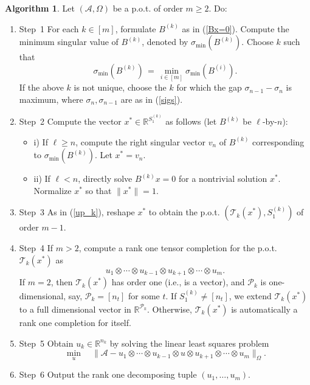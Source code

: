 \documentclass{amsart}
\newcommand{\re}{\mathbb{R}}
\newcommand{\sig}{\sigma}
\newcommand{\reff}[1]{(\ref{#1})}
\newcommand{\mc}[1]{\mathcal{#1}}
\newcommand{\ddd}{,\ldots,}
\newcommand{\bnum}{\begin{enumerate}}
\newcommand{\enum}{\end{enumerate}}
\newcommand{\bit}{\begin{itemize}}
\newcommand{\eit}{\end{itemize}}
\newcommand{\be}{\begin{equation}}
\newcommand{\ee}{\end{equation}}
\theoremstyle{definition}
\newtheorem{alg}[theorem]{Algorithm}
\numberwithin{equation}{section}
\begin{document}
\begin{alg}\label{alg:recursive}
Let $(\mc{A}, \Omega)$ be a p.o.t. of order $m \ge 2$.
Do:

\bnum

\item[Step~1] For each $k \in [m]$,
formulate $B^{(k)}$ as in \reff{Bx=0}.
Compute the minimum singular value of $B^{(k)}$, denoted by $\sig_{\min}(B^{(k)})$.
Choose $k$ such that
\be\label{sig(Bk)}
\sig_{\min}(B^{(k)}) \,=\, \min_{i \in [m]} \sig_{\min}(B^{(i)}).
\ee
If the above $k$ is not unique, choose the $k$ for which the gap 
$\sig_{n-1} - \sig_n$ is maximum, where $\sig_n, \sig_{n-1} $ are as in \reff{sigs}.


\item[Step~2] Compute the vector $x^* \in \re^{S_1^{(k)}}$ as follows
(let $B^{(k)}$ be $\ell$-by-$n$):
\bit
\item[i)] If $\ell \ge n$, compute the right singular vector
$v_n$ of $B^{(k)}$ corresponding to $\sig_{\min}(B^{(k)})$. 
Let $x^* = v_n$.

\item[ii)] If $\ell < n$, directly solve $B^{(k)}x = 0$ for a nontrivial solution $x^*$.
Normalize $x^*$ so that $\|x^*\|=1$. 
\eit


\item[Step~3] 
As in \reff{up_k}, reshape $x^*$ to obtain the p.o.t. $(\mc{T}_k(x^*), S_1^{(k)})$ of order $m-1$.

\item[Step~4] 
If $m>2$, compute a rank one tensor completion for the p.o.t. $\mc{T}_k(x^*)$ as
\be\label{u_1...u_m - u_k}
u_1 \otimes \cdots \otimes u_{k-1} \otimes u_{k+1} \otimes \cdots \otimes u_m.
\ee
If $m=2$, then $\mc{T}_k(x^*)$ has order one (i.e., is a vector), 
and $\mc{P}_k$ is one-dimensional, say, $\mc{P}_k = [n_t]$ for some $t$.
If $S_1^{(k)} \ne [n_t]$,
we extend $\mc{T}_k(x^*)$ to a full dimensional vector in $\re^{\mc{P}_k}$.
Otherwise, $\mc{T}_k(x^*)$ is automatically a rank one completion for itself.

\item[Step~5] Obtain $u_k \in \re^{n_k}$ by solving the linear least squares problem
\be\label{LS_induct}
\min_{u} \quad \| \mc{A} - u_1 \otimes \cdots \otimes u_{k-1} \otimes u \otimes u_{k+1} \otimes \cdots \otimes u_m \|_{\Omega}.
\ee

\item[Step~6] Output the rank one decomposing tuple $(u_1 \ddd u_m)$.

\enum
\end{alg}
\end{document}
